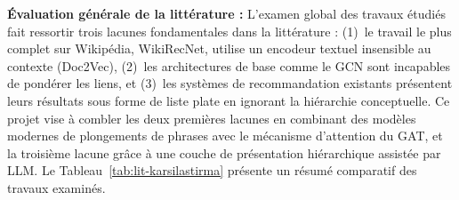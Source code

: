 \vspace{0.5em}
\noindent\textbf{Évaluation générale de la littérature :}
L'examen global des travaux étudiés fait ressortir trois lacunes fondamentales dans la littérature : (1)~le travail le plus complet sur Wikipédia, WikiRecNet, utilise un encodeur textuel insensible au contexte (Doc2Vec), (2)~les architectures de base comme le GCN sont incapables de pondérer les liens, et (3)~les systèmes de recommandation existants présentent leurs résultats sous forme de liste plate en ignorant la hiérarchie conceptuelle. Ce projet vise à combler les deux premières lacunes en combinant des modèles modernes de plongements de phrases avec le mécanisme d'attention du GAT, et la troisième lacune grâce à une couche de présentation hiérarchique assistée par LLM. Le Tableau~\ref{tab:lit-karsilastirma} présente un résumé comparatif des travaux examinés.

